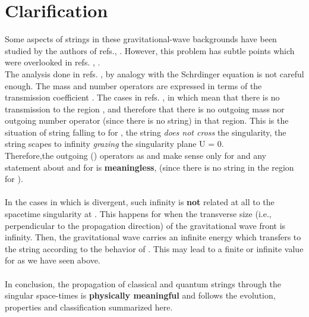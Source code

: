 \documentclass[12pt,a4paper]{article}
\begin{document}
\section{Clarification} 
Some aspects of strings in these gravitational-wave backgrounds have been 
studied by the authors of refs.\cite{hs1}, \cite{hs2}. 
However, this problem has subtle points which were overlooked in refs.
\cite{hs1}, \cite{hs2}.\\ The 
analysis done in refs. \cite{hs1}, \cite{hs2} by analogy with the Schr\coordHE{}dinger 
equation is not careful enough. The mass and number operators are expressed 
in terms of the transmission coefficient \coordHE{}. The cases in refs. \cite{hs1}, \cite{hs2}  in which \coordHE{} mean that there is no transmission to 
the region \coordHE{}, 
and therefore that there is no outgoing mass nor outgoing number operator 
(since there is no string) in 
that region. This is the situation of string falling to \coordHE{} for \coordHE{}, the string {\it does not cross} the singularity, the string scapes 
to infinity {\it grazing} the singularity plane U = 0.\\ 
Therefore,the outgoing (\myHighlight{$>$}\coordHE{}) operators as \coordHE{} and \coordHE{} make sense only 
for \coordHE{} and any statement about \coordHE{} and \coordHE{} for \coordHE{} is {\bf meaningless}, (since there is no string in the \myHighlight{$>$}\coordHE{} region for 
\coordHE{}). \\ \\
In the cases in which \coordHE{} is divergent, such infinity is 
{\bf not} related at all to the spacetime singularity at \coordHE{}. This happens for 
\coordHE{} when the transverse size (i.e., perpendicular to the propagation 
direction) of the gravitational wave front is infinity. Then, the 
gravitational wave carries an infinite energy which transfers to the string 
according to the behavior of \coordHE{}. This may lead to a finite or infinite 
value for \coordHE{} as we have seen above.\\ \\
In conclusion, the propagation of classical and quantum strings through the 
singular space-times is {\bf physically meaningful} and follows the 
evolution, properties and classification summarized here.
\end{document}

